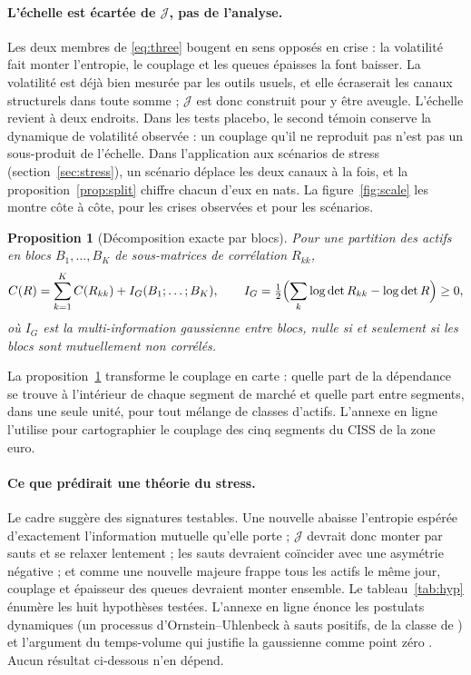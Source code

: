 \documentclass[12pt]{article}
\newtheorem{proposition}{Proposition}
\theoremstyle{definition}
\newcommand{\JJ}{\mathcal{J}}
\begin{document}
\begin{doublespace}
\paragraph{L'échelle est écartée de $\JJ$, pas de l'analyse.} Les deux membres
de \eqref{eq:three} bougent en sens opposés en crise : la volatilité fait
monter l'entropie, le couplage et les queues épaisses la font baisser. La
volatilité est déjà bien mesurée par les outils usuels, et elle écraserait les
canaux structurels dans toute somme ; $\JJ$ est donc construit pour y être
aveugle. L'échelle revient à deux endroits. Dans les tests placebo, le second
témoin conserve la dynamique de volatilité observée : un couplage qu'il ne
reproduit pas n'est pas un sous-produit de l'échelle. Dans l'application aux
scénarios de stress (section~\ref{sec:stress}), un scénario déplace les deux
canaux à la fois, et la proposition~\ref{prop:split} chiffre chacun d'eux en
nats. La figure~\ref{fig:scale} les montre côte à côte, pour les crises
observées et pour les scénarios.

\begin{proposition}[Décomposition exacte par blocs]
\label{prop:blocks}
Pour une partition des actifs en blocs $B_1,\dots,B_K$ de sous-matrices de
corrélation $R_{kk}$,
\begin{equation}
\label{eq:blocks}
C(R)=\sum_{k=1}^K C(R_{kk})+I_G(B_1;\dots;B_K),\qquad
I_G=\tfrac12\Bigl(\sum_k\log\det R_{kk}-\log\det R\Bigr)\ge0,
\end{equation}
où $I_G$ est la multi-information gaussienne entre blocs, nulle si et
seulement si les blocs sont mutuellement non corrélés.
\end{proposition}

La proposition~\ref{prop:blocks} transforme le couplage en carte : quelle part
de la dépendance se trouve à l'intérieur de chaque segment de marché et quelle
part entre segments, dans une seule unité, pour tout mélange de classes
d'actifs. L'annexe en ligne l'utilise pour cartographier le couplage des cinq
segments du CISS de la zone euro.

\paragraph{Ce que prédirait une théorie du stress.} Le cadre suggère des
signatures testables. Une nouvelle abaisse l'entropie espérée d'exactement
l'information mutuelle qu'elle porte \citep[ch.~2]{cover2006} ; $\JJ$ devrait
donc monter par sauts et se relaxer lentement ; les sauts devraient coïncider
avec une asymétrie négative ; et comme une nouvelle majeure frappe tous les
actifs le même jour, couplage et épaisseur des queues devraient monter
ensemble. Le tableau~\ref{tab:hyp} énumère les huit hypothèses testées.
L'annexe en ligne énonce les postulats dynamiques (un processus
d'Ornstein--Uhlenbeck à sauts positifs, de la classe de \citealp{bns2001}) et
l'argument du temps-volume qui justifie la gaussienne comme point zéro
\citep{clark1973,tauchen1983,ane2000}. Aucun résultat ci-dessous n'en dépend.


\end{doublespace}
\end{document}

